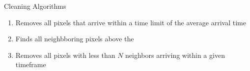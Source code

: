 \begin{frame}{Cleaning Algorithms}
{\begin{overlayarea}{0.58\textwidth}{3.5cm}
{\begin{enumerate}
        \item Removes all pixels that arrive within a time limit of the average arrival time
        \item Finds all neighbboring pixels above the 
        \item Removes all pixels with less than \(N\) neighbors arriving within a given timeframe
      \end{enumerate}
      }
    \end{overlayarea}
    }
  \end{frame}